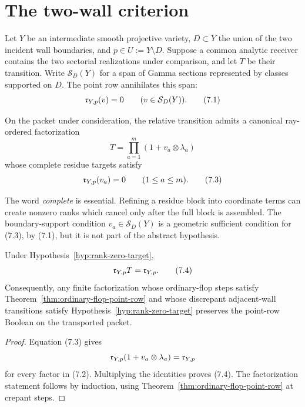 \section{The two-wall criterion}
\label{sec:two-wall}

Let \(Y\) be an intermediate smooth projective variety, \(D\subset Y\) the
union of the two incident wall boundaries, and \(p\in U:=Y\setminus D\).
Suppose a common analytic receiver contains the two sectorial realizations
under comparison, and let \(T\) be their transition.  Write
\(\mathcal S_D(Y)\) for a span of Gamma sections represented by classes
supported on \(D\).  The point row annihilates this span:
\[
 \mathfrak r_{Y,p}(v)=0\qquad(v\in\mathcal S_D(Y)).                  \tag{7.1}
\]

\begin{hypothesis}
\label{hyp:rank-zero-target}
On the packet under consideration, the relative transition admits a
canonical ray-ordered factorization
\[
 T=\prod_{a=1}^m(1+v_a\otimes\lambda_a)                       \tag{7.2}
\]
whose complete residue targets satisfy
\[
 \mathfrak r_{Y,p}(v_a)=0\qquad(1\le a\le m).                       \tag{7.3}
\]
\end{hypothesis}

The word \emph{complete} is essential.  Refining a residue block into
coordinate terms can create nonzero ranks which cancel only after the full
block is assembled.  The boundary-support condition
\(v_a\in\mathcal S_D(Y)\) is a geometric sufficient condition for (7.3), by
(7.1), but it is not part of the abstract hypothesis.

\begin{theorem}
\label{thm:rank-zero-target}
Under Hypothesis~\ref{hyp:rank-zero-target},
\[
 \mathfrak r_{Y,p}T=\mathfrak r_{Y,p}.                                    \tag{7.4}
\]
Consequently, any finite factorization whose ordinary-flop steps satisfy
Theorem~\ref{thm:ordinary-flop-point-row} and whose discrepant adjacent-wall
transitions satisfy Hypothesis~\ref{hyp:rank-zero-target} preserves the
point-row Boolean on the transported packet.
\end{theorem}

\begin{proof}
Equation (7.3) gives
\[
 \mathfrak r_{Y,p}(1+v_a\otimes\lambda_a)=\mathfrak r_{Y,p}
\]
for every factor in (7.2).  Multiplying the identities proves (7.4).  The
factorization statement follows by induction, using
Theorem~\ref{thm:ordinary-flop-point-row} at crepant steps.
\end{proof}

